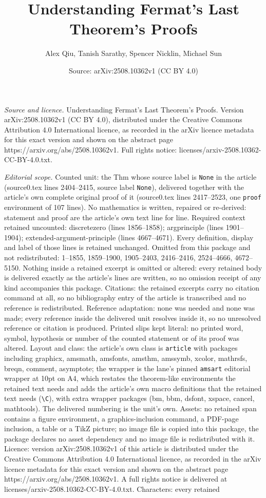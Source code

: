 \documentclass[10pt,a4paper]{amsart}
\title[Understanding Fermat's Last Theorem's Proofs]{Understanding Fermat's Last Theorem's Proofs}
\author{Alex Qiu, Tanish Sarathy, Spencer Nicklin, Michael Sun}
\date{Source: arXiv:2508.10362v1 (CC BY 4.0)}
\begin{document}
\maketitle

\noindent\emph{Source and licence.} Understanding Fermat's Last Theorem's Proofs. Version arXiv:2508.10362v1 (CC BY 4.0), distributed under the Creative Commons Attribution 4.0 International licence, as recorded in the arXiv licence metadata for this exact version and shown on the abstract page https://arxiv.org/abs/2508.10362v1. Full rights notice: licenses/arxiv-2508.10362-CC-BY-4.0.txt.\par\smallskip

\noindent\textit{Editorial scope.} Counted unit: the Thm whose source label is \texttt{None} in the article (source0.tex lines 2404--2415, source label \texttt{None}), delivered together with the article's own complete original proof of it (source0.tex lines 2417--2523, one \texttt{proof} environment of 107 lines). No mathematics is written, repaired or re-derived: statement and proof are the article's own text line for line. Required context retained uncounted: discretezero (lines 1856--1858); argprinciple (lines 1901--1904); extended-argument-principle (lines 4667--4671). Every definition, display and label of those lines is retained unchanged. Omitted from this package and not redistributed: 1--1855, 1859--1900, 1905--2403, 2416--2416, 2524--4666, 4672--5150. Nothing inside a retained excerpt is omitted or altered: every retained body is delivered exactly as the article's lines are written, so no omission receipt of any kind accompanies this package. Citations: the retained excerpts carry no citation command at all, so no bibliography entry of the article is transcribed and no reference is redistributed. Reference adaptation: none was needed and none was made; every reference inside the delivered unit resolves inside it, so no unresolved reference or citation is produced. Printed slips kept literal: no printed word, symbol, hypothesis or number of the counted statement or of its proof was altered. Layout and class: the article's own class is \texttt{article} with packages including graphicx, amsmath, amsfonts, amsthm, amssymb, xcolor, mathrsfs, breqn, comment, asymptote; the wrapper is the lane's pinned \texttt{amsart} editorial wrapper at 10pt on A4, which restates the theorem-like environments the retained text needs and adds the article's own macro definitions that the retained text needs (\texttt{\textbackslash C}), with extra wrapper packages (bm, bbm, dsfont, xspace, cancel, mathtools). The delivered numbering is the unit's own. Assets: no retained span contains a figure environment, a graphics-inclusion command, a PDF-page inclusion, a table or a TikZ picture; no image file is copied into this package, the package declares no asset dependency and no image file is redistributed with it. Licence: version arXiv:2508.10362v1 of this article is distributed under the Creative Commons Attribution 4.0 International licence, as recorded in the arXiv licence metadata for this exact version and shown on the abstract page https://arxiv.org/abs/2508.10362v1. A full rights notice is delivered at licenses/arxiv-2508.10362-CC-BY-4.0.txt. Characters: every retained 
\end{document}
